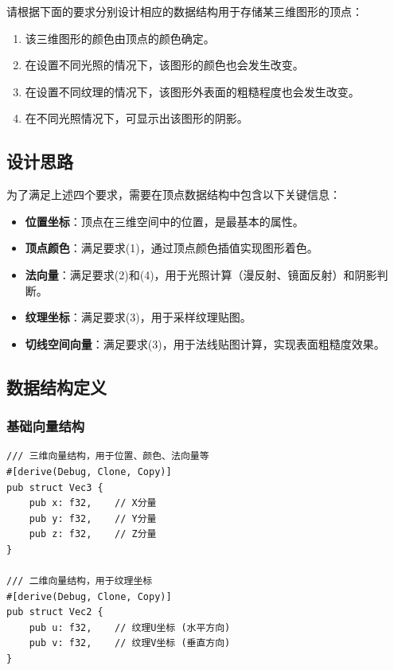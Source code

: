 \documentclass[12pt,a4paper]{article}
\begin{document}
请根据下面的要求分别设计相应的数据结构用于存储某三维图形的顶点：
\begin{enumerate}
    \item 该三维图形的颜色由顶点的颜色确定。
    \item 在设置不同光照的情况下，该图形的颜色也会发生改变。
    \item 在设置不同纹理的情况下，该图形外表面的粗糙程度也会发生改变。
    \item 在不同光照情况下，可显示出该图形的阴影。
\end{enumerate}

\subsection{设计思路}

为了满足上述四个要求，需要在顶点数据结构中包含以下关键信息：

\begin{itemize}
    \item \textbf{位置坐标}：顶点在三维空间中的位置，是最基本的属性。
    \item \textbf{顶点颜色}：满足要求(1)，通过顶点颜色插值实现图形着色。
    \item \textbf{法向量}：满足要求(2)和(4)，用于光照计算（漫反射、镜面反射）和阴影判断。
    \item \textbf{纹理坐标}：满足要求(3)，用于采样纹理贴图。
    \item \textbf{切线空间向量}：满足要求(3)，用于法线贴图计算，实现表面粗糙度效果。
\end{itemize}

\subsection{数据结构定义}

\subsubsection{基础向量结构}

\begin{lstlisting}[style=ruststyle, caption={基础向量结构定义}]
/// 三维向量结构，用于位置、颜色、法向量等
#[derive(Debug, Clone, Copy)]
pub struct Vec3 {
    pub x: f32,    // X分量
    pub y: f32,    // Y分量
    pub z: f32,    // Z分量
}

/// 二维向量结构，用于纹理坐标
#[derive(Debug, Clone, Copy)]
pub struct Vec2 {
    pub u: f32,    // 纹理U坐标 (水平方向)
    pub v: f32,    // 纹理V坐标 (垂直方向)
}
\end{lstlisting}
\end{document}
